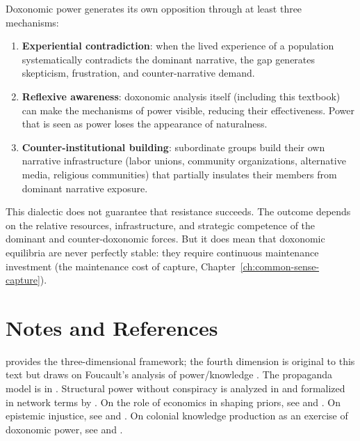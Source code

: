 \begin{principle}
\label{prin:dialectic}
Doxonomic power generates its own opposition through at least three mechanisms:
\begin{enumerate}[nosep]
  \item \textbf{Experiential contradiction}: when the lived experience of a population systematically contradicts the dominant narrative, the gap generates skepticism, frustration, and counter-narrative demand.
  \item \textbf{Reflexive awareness}: doxonomic analysis itself (including this textbook) can make the mechanisms of power visible, reducing their effectiveness. Power that is seen as power loses the appearance of naturalness.
  \item \textbf{Counter-institutional building}: subordinate groups build their own narrative infrastructure (labor unions, community organizations, alternative media, religious communities) that partially insulates their members from dominant narrative exposure.
\end{enumerate}
\end{principle}

\begin{remark}
This dialectic does not guarantee that resistance succeeds.
The outcome depends on the relative resources, infrastructure, and strategic competence of the dominant and counter-doxonomic forces.
But it does mean that doxonomic equilibria are never perfectly stable: they require continuous maintenance investment (the maintenance cost of capture, Chapter~\ref{ch:common-sense-capture}).
\end{remark}


\section{Notes and References}
\label{sec:ch9-notes}

\textcite{lukes2005} provides the three-dimensional framework; the fourth dimension is original to this text but draws on Foucault's analysis of power/knowledge \autocite{foucault1971}.
The propaganda model is in \textcite{herman1988}.
Structural power without conspiracy is analyzed in \textcite{gramsci1971} and formalized in network terms by \textcite{jackson2008}.
On the role of economics in shaping priors, see \textcite{bowles2011} and \textcite{mirowski2009}.
On epistemic injustice, see \textcite{fricker2007} and \textcite{medina2013}.
On colonial knowledge production as an exercise of doxonomic power, see \textcite{said1978} and \textcite{fanon1961}.

